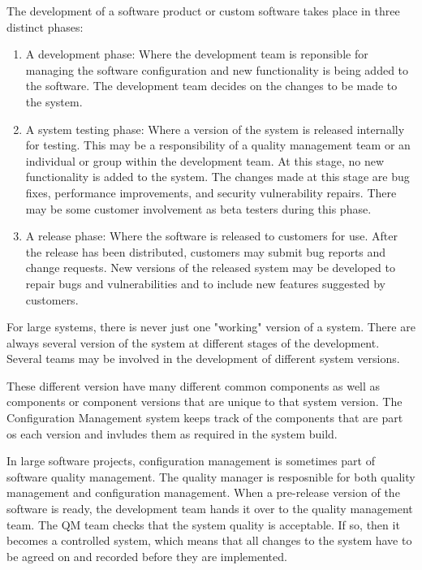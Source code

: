 The development of a software product or custom software takes place in three distinct phases:
\begin{enumerate}
    \item A development phase: Where the development team is reponsible for managing the software configuration and new functionality is being added to the software. The development team decides on the changes to be made to the system.
    \item A system testing phase: Where a version of the system is released internally for testing. This may be a responsibility of a quality management team or an individual or group within the development team. At this stage, no new functionality is added to the system. The changes made at this stage are bug fixes, performance improvements, and security vulnerability repairs. There may be some customer involvement as beta testers during this phase.
    \item A release phase: Where the software is released to customers for use. After the release has been distributed, customers may submit bug reports and change requests. New versions of the released system may be developed to repair bugs and vulnerabilities and to include new features suggested by customers.
\end{enumerate}

For large systems, there is never just one "working" version of a system. There are always several version of the system at different stages of the development. Several teams may be involved in the development of different system versions.

These different version have many different common components as well as components or component versions that are unique to that system version. The Configuration Management system keeps track of the components that are part os each version and invludes them as required in the system build.

In large software projects, configuration management is sometimes part of software quality management. The quality manager is resposnible for both quality management and configuration management. When a pre-release version of the software is ready, the development team hands it over to the quality management team. The QM team checks that the system quality is acceptable. If so, then it becomes a controlled system, which means that all changes to the system have to be agreed on and recorded before they are implemented.

